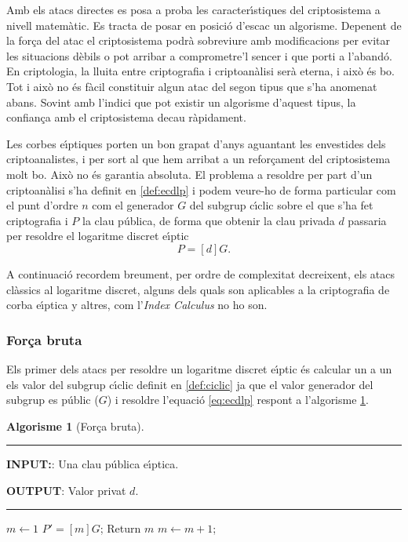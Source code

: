 \documentclass[12pt,twoside,catalan,a4paper]{book}%
\numberwithin{figure}{section}		%
\theoremstyle{definition}   			%
\def\ce{corba e\lgem{}\'{\i}ptica}%
\def\ces{corbes e\lgem{}\'{\i}ptiques}%
\def\sgc{subgrup c\'{\i}clic}%
\def\ecdlp{logaritme discret e\lgem{}\'{\i}ptic}%
\theoremstyle{saltolinea}   			%
\newtheorem{algo}{Algorisme}
\begin{document}
Amb els atacs directes es posa a proba les caracter\'{\i}stiques del criptosistema a nivell matem\`atic. Es tracta de posar en posici\'o d'escac un algorisme. Depenent de la for\c{c}a del atac el criptosistema podr\`a sobreviure amb modificacions per evitar les situacions d\`ebils o pot arribar a comprometre'l sencer i que porti a l'aband\'o. En criptologia, la lluita entre criptografia i criptoan\`alisi ser\`a eterna, i aix\`o \'es bo. Tot i aix\`o no \'es f\`acil constituir algun atac del segon tipus que s'ha anomenat abans. Sovint amb l'indici que pot existir un algorisme d'aquest tipus, la confian\c{c}a amb el criptosistema decau r\`apidament.

Les \ces{} porten un bon grapat d'anys aguantant les envestides dels criptoanalistes, i per sort al que hem arribat a un refor\c{c}ament del criptosistema molt bo. Aix\`o no \'es garantia absoluta. El problema a resoldre per part d'un criptoan\`alisi s'ha definit en \ref{def:ecdlp} i podem veure-ho de forma particular com el punt d'ordre $n$ com el generador $G$ del \sgc{} sobre el que s'ha fet criptografia i $P$ la clau p\'ublica, de forma que obtenir la clau privada $d$ passaria per resoldre el \ecdlp{}
\begin{equation}\label{eq:ecdlp} P = [d]G.\end{equation}

A continuaci\'o recordem breument, per ordre de complexitat decreixent, els atacs cl\`assics al logaritme discret, alguns dels quals son aplicables a la criptografia de \ce{} y altres, com l'\emph{Index Calculus} no ho son.

\subsubsection{For\c{c}a bruta}

Els primer dels atacs per resoldre un \ecdlp{} \'es calcular un a un els valor del \sgc{} definit en \ref{def:ciclic} ja que el valor generador del subgrup es p\'ublic ($G$) i resoldre l'equaci\'o \ref{eq:ecdlp} respont a l'algorisme \ref{alg:bruteForce}.

\begin{algo}[For\c{c}a bruta]\label{alg:bruteForce}
\parbox[b]{\linewidth}{%
\hrule
\smallskip
{\bf INPUT:}: Una clau p\'ublica e\lgem{}\'{\i}ptica.

{\bf OUTPUT}: Valor privat $d$.
\vspace{1.5mm}
\hrule
}%
\begin{algorithmic}[1]
\STATE $m \leftarrow 1$
\LOOP
\STATE $P' = [m]G$;
	\STATE Return $m$
\ELSE
	\STATE $m \leftarrow m+1$;
\ENDIF
\ENDLOOP
\end{algorithmic}
\end{algo}
\end{document}
